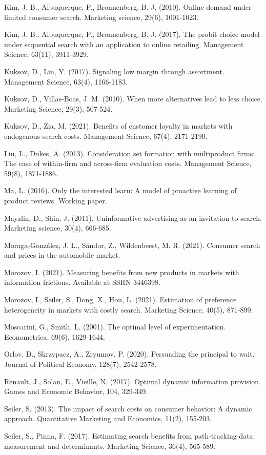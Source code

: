 \documentclass[11pt]{extarticle}
\begin{document}
Kim, J. B., Albuquerque, P., Bronnenberg, B. J. (2010). Online demand under limited consumer search. Marketing science, 29(6), 1001-1023.

Kim, J. B., Albuquerque, P., Bronnenberg, B. J. (2017). The probit choice model under sequential search with an application to online retailing. Management Science, 63(11), 3911-3929.

Kuksov, D., Lin, Y. (2017). Signaling low margin through assortment. Management Science, 63(4), 1166-1183.

Kuksov, D., Villas-Boas, J. M. (2010). When more alternatives lead to less choice. Marketing Science, 29(3), 507-524.

Kuksov, D., Zia, M. (2021). Benefits of customer loyalty in markets with endogenous search costs. Management Science, 67(4), 2171-2190.

Liu, L., Dukes, A. (2013). Consideration set formation with multiproduct firms: The case of within-firm and across-firm evaluation costs. Management Science, 59(8), 1871-1886.

Ma, L. (2016). Only the interested learn: A model of proactive learning of product reviews. Working paper.

Mayzlin, D., Shin, J. (2011). Uninformative advertising as an invitation to search. Marketing science, 30(4), 666-685.

Moraga-González, J. L., Sándor, Z., Wildenbeest, M. R. (2021). Consumer search and prices in the automobile market.

Morozov, I. (2021). Measuring benefits from new products in markets with information frictions. Available at SSRN 3446398.

Morozov, I., Seiler, S., Dong, X., Hou, L. (2021). Estimation of preference heterogeneity in markets with costly search. Marketing Science, 40(5), 871-899.

Moscarini, G., Smith, L. (2001). The optimal level of experimentation. Econometrica, 69(6), 1629-1644.

Orlov, D., Skrzypacz, A., Zryumov, P. (2020). Persuading the principal to wait. Journal of Political Economy, 128(7), 2542-2578.

Renault, J., Solan, E., Vieille, N. (2017). Optimal dynamic information provision. Games and Economic Behavior, 104, 329-349.

Seiler, S. (2013). The impact of search costs on consumer behavior: A dynamic approach. Quantitative Marketing and Economics, 11(2), 155-203.

Seiler, S., Pinna, F. (2017). Estimating search benefits from path-tracking data: measurement and determinants. Marketing Science, 36(4), 565-589.
\end{document}
